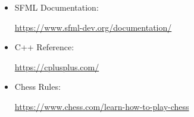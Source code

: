 \documentclass[11pt]{article}
\begin{document}
\begin{itemize}
    \item SFML Documentation:
    
    \url{https://www.sfml-dev.org/documentation/}
    
    \item C++ Reference:
    
    \url{https://cplusplus.com/}
    
    \item Chess Rules:
    
    \url{https://www.chess.com/learn-how-to-play-chess}
\end{itemize}

\end{document}
